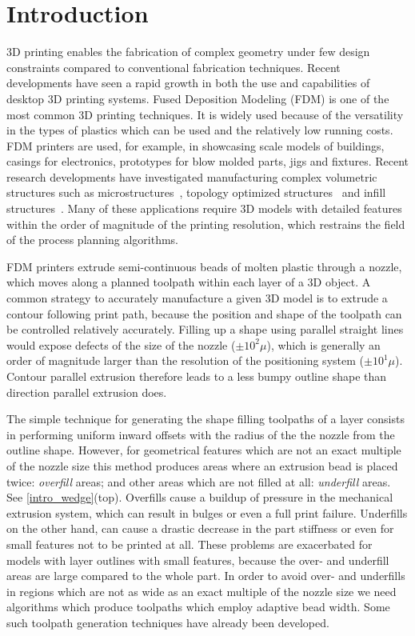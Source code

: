 \section{Introduction}
3D printing enables the fabrication of complex geometry under few design constraints compared to conventional fabrication techniques.
Recent developments have seen a rapid growth in both the use and capabilities of desktop 3D printing systems.
Fused Deposition Modeling (FDM) is one of the most common 3D printing techniques.
It is widely used because of the versatility in the types of plastics which can be used and the relatively low running costs.
FDM printers are used, for example, in showcasing scale models of buildings, casings for electronics, prototypes for blow molded parts, jigs and fixtures.
Recent research developments have investigated manufacturing complex volumetric structures such as microstructures~\cite{}, topology optimized structures~\cite{} and infill structures~\cite{}.
Many of these applications require 3D models with detailed features within the order of magnitude of the printing resolution, which restrains the field of the process planning algorithms.

FDM printers extrude semi-continuous beads of molten plastic through a nozzle, which moves along a planned toolpath within each layer of a 3D object.
A common strategy to accurately manufacture a given 3D model is to extrude a contour following print path,
because the position and shape of the toolpath can be controlled relatively accurately.
Filling up a shape using parallel straight lines would expose defects of the size of the nozzle ($\pm 10^2 \mu$), which is generally an order of magnitude larger than the resolution of the positioning system ($\pm 10^1 \mu$).
Contour parallel extrusion therefore leads to a less bumpy outline shape than direction parallel extrusion does.


The simple technique for generating the shape filling toolpaths of a layer consists in performing uniform inward offsets with the radius of the the nozzle from the outline shape.
However, for geometrical features which are not an exact multiple of the nozzle size this method produces areas where an extrusion bead is placed twice: \emph{overfill} areas; and other areas which are not filled at all: \emph{underfill} areas.
See \cref{intro_wedge}(top).
Overfills cause a buildup of pressure in the mechanical extrusion system, which can result in bulges or even a full print failure.
Underfills on the other hand, can cause a drastic decrease in the part stiffness or even for small features not to be printed at all.
These problems are exacerbated for models with layer outlines with small features, because the over- and underfill areas are large compared to the whole part.
In order to avoid over- and underfills in regions which are not as wide as an exact multiple of the nozzle size we need algorithms which produce toolpaths which employ adaptive bead width.
Some such toolpath generation techniques have already been developed.

